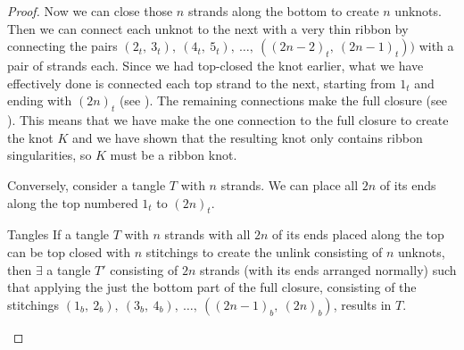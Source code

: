 \begin{paper}
\begin{proof}


Now we can close those $n$ strands along the bottom to create $n$ unknots.
Then we can connect each unknot to the next with a very thin ribbon by
connecting the pairs $(2_t,~3_t),~(4_t,~5_t),~\dots,~((2n-2)_t,~(2n-1)_t))$ with
a pair of strands each.
Since we had top-closed the knot earlier, what we have effectively done is
connected each top strand to the next, starting from $1_t$ and ending with
$(2n)_t$ (see \figProof).
The remaining connections make the full closure (see \figFull).
This means that we have make the one connection to the full closure to create
the knot $K$ and we have shown that the resulting knot only contains ribbon
singularities, so $K$ must be a ribbon knot.

Conversely, consider a tangle $T$ with $n$ strands.
We can place all $2n$ of its ends along the top numbered $1_t$ to $(2n)_t$.
\begin{paperlem}{Tangles}
If a tangle $T$ with $n$ strands with all $2n$ of its ends placed along the top
can be top closed with $n$ stitchings to create the unlink consisting of $n$
unknots, then $\exists$ a tangle $T'$ consisting of $2n$ strands (with its ends
arranged normally) such that applying the just the bottom part of the full
closure, consisting of the stitchings
$(1_b,~2_b),~(3_b,~4_b),~\dots,~((2n-1)_b,~(2n)_b)$, results in $T$.



\end{paperlem}
\end{proof}
\end{paper}
